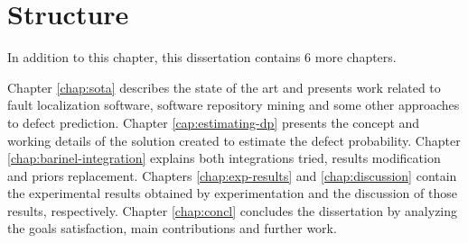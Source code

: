 \section{Structure} \label{sec:struct}

In addition to this chapter, this dissertation contains 6 more chapters.

Chapter \ref{chap:sota} describes the state of the art and presents work related to fault localization software, software repository mining and some other approaches to defect prediction. Chapter \ref{cap:estimating-dp} presents the concept and working details of the solution created to estimate the defect probability. Chapter \ref{chap:barinel-integration} explains both integrations tried, results modification and priors replacement. Chapters \ref{chap:exp-results} and \ref{chap:discussion} contain the experimental results obtained by experimentation and the discussion of those results, respectively. Chapter \ref{chap:concl} concludes the dissertation by analyzing the goals satisfaction, main contributions and further work.
